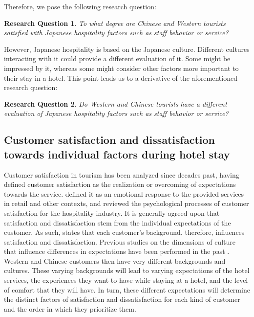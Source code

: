 \documentclass[smallextended,natbib]{svjour3}       %
\makeatletter
\newtheorem{rsq}{Research Question}
\newcounter{subrsq}
\newenvironment{subrsq}
         {%
          \setcounter{subrsq}{0}%
          \stepcounter{rsq}%
          \edef\saved@rsq{\thersq}%
          \let\c@rsq\c@subrsq     %
          \renewcommand{\thersq}{\saved@rsq\alph{rsq}}%
         }
         {}
\makeatother
\begin{document}
    Therefore, we pose the following research question:

    \begin{subrsq}
    \begin{rsq}
    \label{rsq:hospitality}
    To what degree are Chinese and Western tourists satisfied with Japanese hospitality factors such as staff behavior or service?
    \end{rsq}

    However, Japanese hospitality is based on the Japanese culture. Different cultures interacting with it could provide a different evaluation of it. Some might be impressed by it, whereas some might consider other factors more important to their stay in a hotel. This point leads us to a derivative of the aforementioned research question:

    \begin{rsq}
    \label{rsq:hospitality_both}
    Do Western and Chinese tourists have a different evaluation of Japanese hospitality factors such as staff behavior or service?
    \end{rsq}
    \end{subrsq}

  \subsection{Customer satisfaction and dissatisfaction towards individual factors during hotel stay}\label{theory_satisfaction}

    Customer satisfaction in tourism has been analyzed since decades past, \cite{hunt1975} having defined customer satisfaction as the realization or overcoming of expectations towards the service. \cite{oliver1981} defined it as an emotional response to the provided services in retail and other contexts, and \cite{oh1996} reviewed the psychological processes of customer satisfaction for the hospitality industry. It is generally agreed upon that satisfaction and dissatisfaction stem from the individual expectations of the customer. As such, \cite{engel1990} states that each customer's background, therefore, influences satisfaction and dissatisfaction. Previous studies on the dimensions of culture that influence differences in expectations have been performed in the past \cite{donthu1998cultural}. Western and Chinese customers then have very different backgrounds and cultures. These varying backgrounds will lead to varying expectations of the hotel services, the experiences they want to have while staying at a hotel, and the level of comfort that they will have. In turn, these different expectations will determine the distinct factors of satisfaction and dissatisfaction for each kind of customer and the order in which they prioritize them. 
\end{document}
